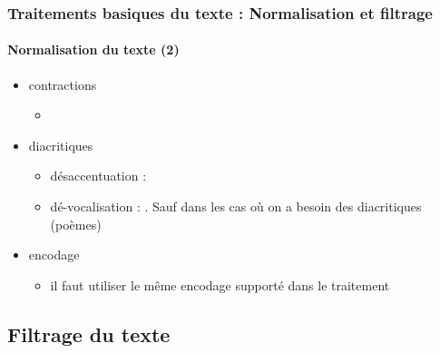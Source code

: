 \documentclass[xcolor=table]{beamer}
\begin{document}
\begin{frame}
\frametitle{Traitements basiques du texte : Normalisation et filtrage}
\framesubtitle{Normalisation du texte (2)}

\begin{itemize}
	
	\item contractions
	\begin{itemize}
		\item {}
	\end{itemize}
	
	\item diacritiques
	\begin{itemize}
		\item désaccentuation :  
		\item dé-vocalisation :  . Sauf dans les cas où on a besoin des diacritiques (poèmes)
	\end{itemize}

	\item encodage 
	\begin{itemize}
		\item il faut utiliser le même encodage supporté dans le traitement
	\end{itemize}

\end{itemize}

\end{frame}

\subsection{Filtrage du texte}
\end{document}

